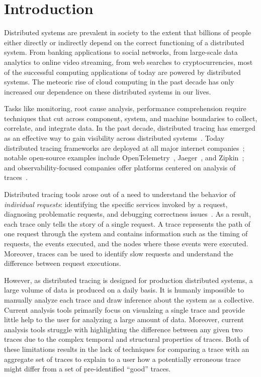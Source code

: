 \section{Introduction}
\label{sec:intro}

Distributed systems are prevalent in society to the extent that billions of people either directly or 
indirectly depend on the correct functioning of a distributed system. From banking applications to social
networks, from large-scale data analytics to online video streaming, from web searches to cryptocurrencies,
most of the successful computing applications of today are powered by distributed systems.
The meteoric rise of cloud computing in the past decade has only increased our dependence on these
distributed systems in our lives.

Tasks like monitoring, root cause analysis, performance comprehension require techniques that cut across component,
system, and machine boundaries to collect, correlate, and integrate data. In the past decade, distributed tracing has emerged as an effective way to gain visibility across distributed systems~\cite{mace2015pivot,mace2018universal,fonseca2007xtrace}.  
Today distributed tracing frameworks are deployed at all major internet companies~\cite{kaldor2017canopy,sigelman2010dapper,netflixtracing}; 
notable open-source examples include OpenTelemetry~\cite{opentelemetry}, Jaeger~\cite{jaeger}, and Zipkin~\cite{zipkin}; and 
observability-focused companies offer platforms centered on analysis of traces~\cite{lightstep}.

Distributed tracing tools arose out of a need to understand the behavior of \emph{individual requests}: identifying the specific services 
invoked by a request, diagnosing problematic requests, and debugging correctness issues~\cite{fonseca2007xtrace,sigelman2010dapper,macewe}.
As a result, each trace only tells the story of a single request.
A trace represents the path of one request through the system and contains information such as the timing of requests, 
the events executed, and the nodes where these events were executed. Moreover, traces can be used
to identify slow requests and understand the difference between request executions. 

However, as distributed tracing is designed for production distributed systems, a large volume of data
is produced on a daily basis. It is humanly impossible to manually analyze each trace and draw inference
about the system as a collective. Current analysis tools primarily focus on visualzing a single trace
and provide little help to the user for analyzing a large amount of data. Moreover, current analysis
tools struggle with highlighting the difference between any given two traces due to the complex temporal
and structural properties of traces. Both of these limitations results in the lack of techniques for
comparing a trace with an aggregate set of traces to explain to a user how a potentially erroneous trace
might differ from a set of pre-identified ``good'' traces.

